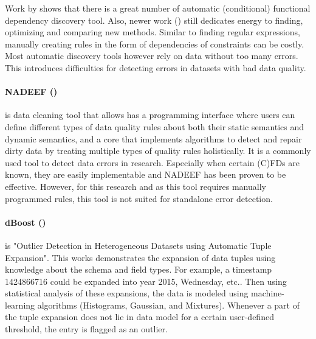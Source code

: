 Work by \cite{Asghar2015-yq} shows that there is a great number of automatic (conditional) functional dependency discovery tool. Also, newer work (\cite{Rammelaere2019-ps}) still dedicates energy to finding, optimizing and comparing new methods. Similar to finding regular expressions, manually creating rules in the form of dependencies of constraints can be costly. Most automatic discovery tools however rely on data without too many errors. This introduces difficulties for detecting errors in datasets with bad data quality. 

\paragraph{NADEEF (\cite{Dallachiesa2013-he})} is data cleaning tool that allows has a programming interface where users can define different types of data quality rules about both their static semantics and dynamic semantics, and a core that implements algorithms to detect and repair dirty data by treating multiple types of quality rules holistically. It is a commonly used tool to detect data errors in research. Especially when certain (C)FDs are known, they are easily implementable and NADEEF has been proven to be effective. However, for this research and as this tool requires manually programmed rules, this tool is not suited for standalone error detection.


\paragraph{dBoost (\cite{Pit--Claudel2016-dj})} is "Outlier Detection in Heterogeneous Datasets using Automatic Tuple Expansion". This works demonstrates the expansion of data tuples using knowledge about the schema and field types. For example, a timestamp 1424866716 could be expanded into year 2015, Wednesday, etc.. Then using statistical analysis of these expansions, the data is modeled using machine-learning algorithms (Histograms, Gaussian, and Mixtures). Whenever a part of the tuple expansion does not lie in data model for a certain user-defined threshold, the entry is flagged as an outlier.



